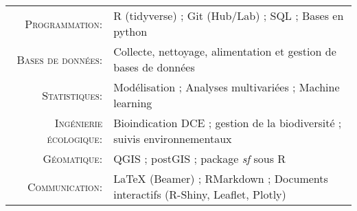 \documentclass[localFont,alternative]{yaac-another-awesome-cv}
\begin{document}
\makecvheader

\renewcommand{\arraystretch}{1.1}

	\begin{tabular}{>{}r>{}p{13cm}} 
		\textsc{Programmation:}              &    R (tidyverse) ; Git (Hub/Lab) ; SQL ; Bases en python\\ 
		\textsc{Bases de données:}               	&   Collecte, nettoyage, alimentation et gestion de bases de données \\ 
		\textsc{Statistiques:}  	 &   Modélisation ;  Analyses multivariées ; Machine learning \\
		\textsc{Ingénierie écologique:}              &    Bioindication DCE ; gestion de la biodiversité ; suivis environnementaux \\
		\textsc{Géomatique:}			&   QGIS ; postGIS ; package \textit{sf} sous R \\ 
		\textsc{Communication:}               	&   LaTeX (Beamer) ; RMarkdown ; Documents interactifs (R-Shiny, Leaflet, Plotly) 
	\end{tabular}
\end{document}
